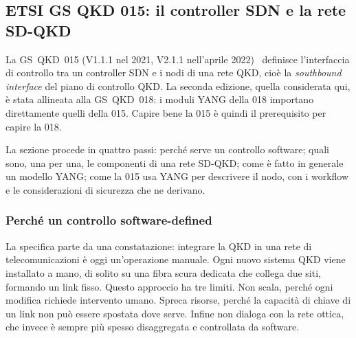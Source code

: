 \subsection{ETSI GS QKD 015: il controller SDN e la rete SD-QKD}
\label{sec:qkd015}

La GS~QKD~015 (V1.1.1 nel 2021, V2.1.1 nell'aprile 2022)~\cite{qkd015}
definisce l'interfaccia di controllo tra un controller SDN e i nodi di una
rete QKD, cioè la \emph{southbound interface} del piano di controllo QKD.
La seconda edizione, quella considerata qui, è stata allineata alla
GS~QKD~018: i moduli YANG della 018 importano direttamente quelli della 015.
Capire bene la 015 è quindi il prerequisito per capire la 018.

La sezione procede in quattro passi: perché serve un controllo software;
quali sono, una per una, le componenti di una rete SD-QKD; come è fatto in
generale un modello YANG; come la 015 usa YANG per descrivere il nodo, con
i workflow e le considerazioni di sicurezza che ne derivano.

\subsubsection{Perché un controllo software-defined}

La specifica parte da una constatazione: integrare la QKD in una rete di
telecomunicazioni è oggi un'operazione manuale. Ogni nuovo sistema QKD
viene installato a mano, di solito su una fibra scura dedicata che collega
due siti, formando un link fisso. Questo approccio ha tre limiti. Non
scala, perché ogni modifica richiede intervento umano. Spreca risorse,
perché la capacità di chiave di un link non può essere spostata dove serve.
Infine non dialoga con la rete ottica, che invece è sempre più spesso
disaggregata e controllata da software.

